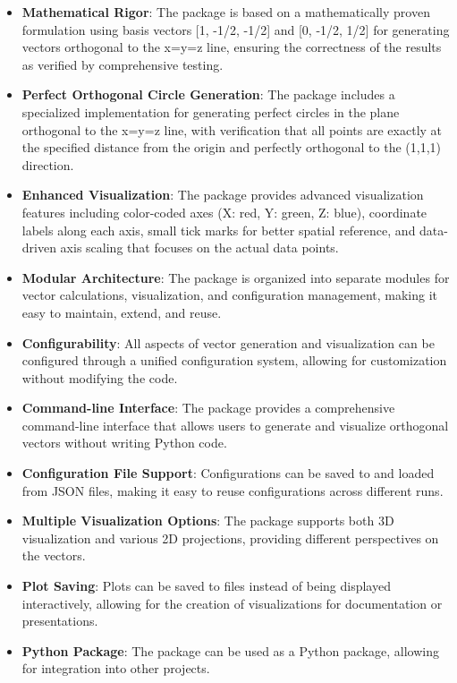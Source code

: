 \begin{itemize}
    \item \textbf{Mathematical Rigor}: The package is based on a mathematically proven formulation using basis vectors [1, -1/2, -1/2] and [0, -1/2, 1/2] for generating vectors orthogonal to the x=y=z line, ensuring the correctness of the results as verified by comprehensive testing.
    
    \item \textbf{Perfect Orthogonal Circle Generation}: The package includes a specialized implementation for generating perfect circles in the plane orthogonal to the x=y=z line, with verification that all points are exactly at the specified distance from the origin and perfectly orthogonal to the (1,1,1) direction.
    
    \item \textbf{Enhanced Visualization}: The package provides advanced visualization features including color-coded axes (X: red, Y: green, Z: blue), coordinate labels along each axis, small tick marks for better spatial reference, and data-driven axis scaling that focuses on the actual data points.
    
    \item \textbf{Modular Architecture}: The package is organized into separate modules for vector calculations, visualization, and configuration management, making it easy to maintain, extend, and reuse.
    
    \item \textbf{Configurability}: All aspects of vector generation and visualization can be configured through a unified configuration system, allowing for customization without modifying the code.
    
    \item \textbf{Command-line Interface}: The package provides a comprehensive command-line interface that allows users to generate and visualize orthogonal vectors without writing Python code.
    
    \item \textbf{Configuration File Support}: Configurations can be saved to and loaded from JSON files, making it easy to reuse configurations across different runs.
    
    \item \textbf{Multiple Visualization Options}: The package supports both 3D visualization and various 2D projections, providing different perspectives on the vectors.
    
    \item \textbf{Plot Saving}: Plots can be saved to files instead of being displayed interactively, allowing for the creation of visualizations for documentation or presentations.
    
    \item \textbf{Python Package}: The package can be used as a Python package, allowing for integration into other projects.
\end{itemize}

